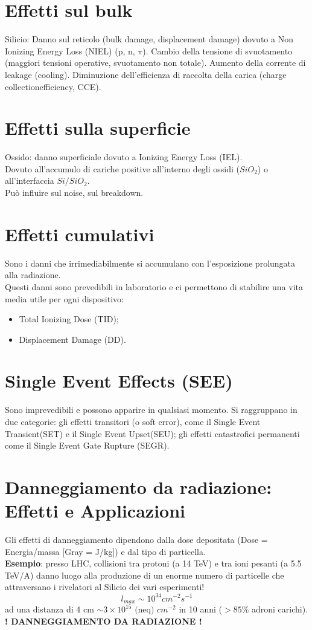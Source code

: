 \documentclass[12pt, letterpaper]{book}
\begin{document}
\section{Effetti sul bulk}
Silicio: Danno sul reticolo (bulk damage, displacement damage) dovuto a Non Ionizing Energy Loss (NIEL) (p, n, $\pi$).
Cambio della tensione di svuotamento (maggiori tensioni operative, svuotamento non totale). Aumento della corrente di leakage (cooling).
Diminuzione dell’efficienza di raccolta della carica (charge collectionefficiency, CCE).

\section{Effetti sulla superficie}
Ossido: danno superficiale dovuto a Ionizing Energy Loss (IEL).\\
Dovuto all'accumulo di cariche positive all'interno degli ossidi ($SiO_2$) o all'interfaccia $Si/SiO_2$.\\
Può influire sul noise, sul breakdown.

\section{Effetti cumulativi}
Sono i danni che irrimediabilmente si accumulano con l’esposizione prolungata alla radiazione.\\
Questi danni sono prevedibili in laboratorio e ci permettono di stabilire una vita media utile per ogni dispositivo:
\begin{itemize}
    \item Total Ionizing Dose (TID);
    \item Displacement Damage (DD).
\end{itemize}

\section{Single Event Effects (SEE)}
Sono imprevedibili e possono apparire in qualsiasi momento. Si raggruppano in due categorie: gli effetti transitori (o soft error), come il Single Event Transient(SET) e il Single Event Upset(SEU); gli effetti catastrofici permanenti come il Single Event Gate Rupture (SEGR).
\section{Danneggiamento da radiazione: Effetti e Applicazioni} %
Gli effetti di danneggiamento dipendono dalla dose depositata (Dose = Energia/massa [Gray = J/kg]) e dal tipo di particella.\\
\textbf{Esempio}: presso LHC, collisioni tra protoni (a 14 TeV) e tra ioni pesanti (a 5.5 TeV/A) danno luogo alla produzione di un enorme numero di particelle che attraversano i rivelatori al Silicio dei vari esperimenti!
$$l_{max}\sim 10^{34} cm^{-2} s^{-1}$$
ad una distanza di 4 cm $\sim 3 \times 10^{15} \text{ (neq) } cm^{-2}$
in 10 anni ($>85\%$ adroni carichi).\\
\textbf{! DANNEGGIAMENTO DA RADIAZIONE !}
\end{document}
